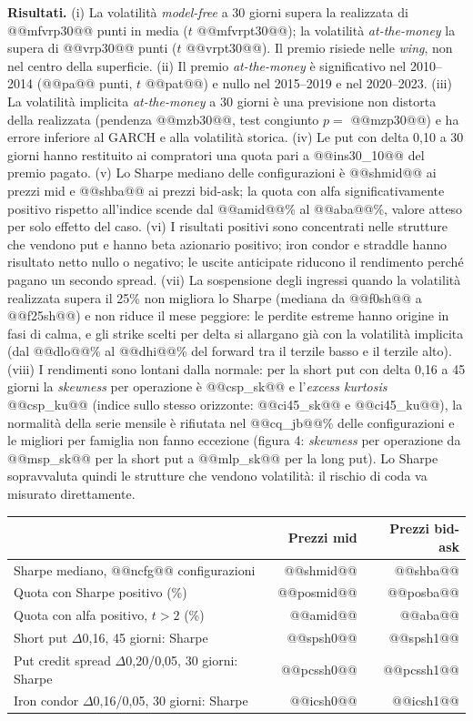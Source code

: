 \documentclass[11pt,a4paper]{article}
\begin{document}
\textbf{Risultati.} (i) La volatilità \emph{model-free} a 30 giorni supera la realizzata di @@mfvrp30@@ punti in media ($t$ @@mfvrpt30@@); la volatilità \emph{at-the-money} la supera di @@vrp30@@ punti ($t$ @@vrpt30@@). Il premio risiede nelle \emph{wing}, non nel centro della superficie. (ii) Il premio \emph{at-the-money} è significativo nel 2010--2014 (@@pa@@ punti, $t$ @@pat@@) e nullo nel 2015--2019 e nel 2020--2023. (iii) La volatilità implicita \emph{at-the-money} a 30 giorni è una previsione non distorta della realizzata (pendenza @@mzb30@@, test congiunto $p=$ @@mzp30@@) e ha errore inferiore al GARCH e alla volatilità storica. (iv) Le put con delta 0{,}10 a 30 giorni hanno restituito ai compratori una quota pari a @@ins30_10@@ del premio pagato. (v) Lo Sharpe mediano delle configurazioni è @@shmid@@ ai prezzi mid e @@shba@@ ai prezzi bid-ask; la quota con alfa significativamente positivo rispetto all'indice scende dal @@amid@@\% al @@aba@@\%, valore atteso per solo effetto del caso. (vi) I risultati positivi sono concentrati nelle strutture che vendono put e hanno beta azionario positivo; iron condor e straddle hanno risultato netto nullo o negativo; le uscite anticipate riducono il rendimento perché pagano un secondo spread. (vii) La sospensione degli ingressi quando la volatilità realizzata supera il 25\% non migliora lo Sharpe (mediana da @@f0sh@@ a @@f25sh@@) e non riduce il mese peggiore: le perdite estreme hanno origine in fasi di calma, e gli strike scelti per delta si allargano già con la volatilità implicita (dal @@dlo@@\% al @@dhi@@\% del forward tra il terzile basso e il terzile alto). (viii) I rendimenti sono lontani dalla normale: per la short put con delta 0{,}16 a 45 giorni la \emph{skewness} per operazione è @@csp_sk@@ e l'\emph{excess kurtosis} @@csp_ku@@ (indice sullo stesso orizzonte: @@ci45_sk@@ e @@ci45_ku@@), la normalità della serie mensile è rifiutata nel @@cq_jb@@\% delle configurazioni e le migliori per famiglia non fanno eccezione (figura 4: \emph{skewness} per operazione da @@msp_sk@@ per la short put a @@mlp_sk@@ per la long put). Lo Sharpe sopravvaluta quindi le strutture che vendono volatilità: il rischio di coda va misurato direttamente.

\begin{center}\small
\begin{tabular}{lrr}\toprule
 & Prezzi mid & Prezzi bid-ask \\ \midrule
Sharpe mediano, @@ncfg@@ configurazioni & @@shmid@@ & @@shba@@ \\
Quota con Sharpe positivo (\%) & @@posmid@@ & @@posba@@ \\
Quota con alfa positivo, $t>2$ (\%) & @@amid@@ & @@aba@@ \\
Short put $\Delta$0{,}16, 45 giorni: Sharpe & @@spsh0@@ & @@spsh1@@ \\
Put credit spread $\Delta$0{,}20/0{,}05, 30 giorni: Sharpe & @@pcssh0@@ & @@pcssh1@@ \\
Iron condor $\Delta$0{,}16/0{,}05, 30 giorni: Sharpe & @@icsh0@@ & @@icsh1@@ \\
\bottomrule\end{tabular}
\end{center}
\end{document}
